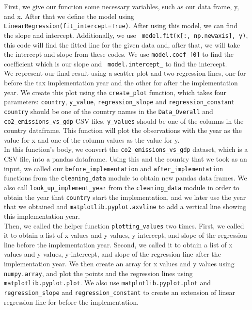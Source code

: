\documentclass[fontsize=11pt]{article}
\begin{document}
\noindent First, we give our function some necessary variables, such as our data frame, y, and x.
After that we define the model using \texttt {{LinearRegression(fit\_intercept=True)}}.
After using this model, we can find the slope and intercept.
Additionally, we use \texttt{ model.fit(x[:, np.newaxis], y)}, this code will find the fitted line for the given data and, after that, we will take the intercept and slope from these codes. We use \texttt {model.coef\_[0]}   to find the coefficient which is our slope and \ \texttt {model.intercept\_}  to find the intercept.\\

\noindent We represent our final result using a scatter plot and two regression lines, one for before the tax implementation year and the other for after the implementation year. We create this plot using the \texttt {create\_plot} function, which takes four parameters: \texttt {country}, \texttt {y\_value}, \texttt{regression\_slope} and \texttt{regression\_constant}\\

\noindent \texttt {country} should be one of the country names in the \texttt {Data\_Overall} and \texttt {co2\_emissions\_vs\_gdp} CSV files. \texttt {y\_values} should be one of the columns in the country dataframe. This function will plot the observations with the year as the value for x and one of the column values as the value for y.\\

\noindent In this function's body, we convert the \texttt {co2\_emissions\_vs\_gdp} dataset, which is a CSV file, into a pandas dataframe. Using this and the country that we took as an input, we called our \texttt {before\_implementation} and \texttt {after\_implementation} functions from the \texttt {cleaning\_data} module to obtain new pandas data frames. We also call \texttt {look\_up\_implement\_year} from the \texttt{cleaning\_data} module in order to obtain the year that \texttt{country} start the implementation, and we later use the year that we obtained  and \texttt{matplotlib.pyplot.axvline} to add a vertical line showing this implementation year. \\

\noindent Then, we called the helper function \texttt {plotting\_values} two times. First, we called it to obtain a list of x values and y values, y-intercept, and slope of the regression line before the implementation year. Second, we called it to obtain a list of x values and y values, y-intercept, and slope of the regression line after the implementation year. We then create an array for x values and y values using \texttt {numpy.array}, and plot the points and the regression lines using \texttt {matplotlib.pyplot.plot}. We also use \texttt {matplotlib.pyplot.plot} and   \texttt{regression\_slope} and \texttt{regression\_constant} to create an extension of linear regression line for before the implementation.\\
\end{document}
